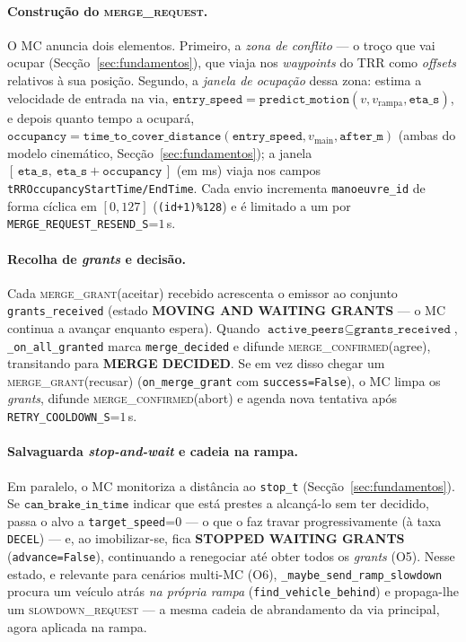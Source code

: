 \documentclass[11pt,a4paper]{article}
\begin{document}
\paragraph{Construção do \textsc{merge\_request}.} O MC anuncia dois elementos. Primeiro, a
\emph{zona de conflito} --- o troço que vai ocupar
(Secção~\ref{sec:fundamentos}), que viaja nos \emph{waypoints} do TRR como \emph{offsets}
relativos à sua posição. Segundo, a \emph{janela de ocupação} dessa zona: estima a
velocidade de entrada na via,
$\texttt{entry\_speed}=\texttt{predict\_motion}(v, v_{\text{rampa}}, \texttt{eta\_s})$, e
depois quanto tempo a ocupará,
$\texttt{occupancy}=\texttt{time\_to\_cover\_distance}(\texttt{entry\_speed}, v_{\text{main}}, \texttt{after\_m})$
(ambas do modelo cinemático, Secção~\ref{sec:fundamentos}); a janela
$[\,\texttt{eta\_s},\ \texttt{eta\_s}+\texttt{occupancy}\,]$ (em ms) viaja nos campos
\texttt{tRROccupancyStartTime/EndTime}. Cada envio incrementa \texttt{manoeuvre\_id} de
forma cíclica em $[0,127]$ (\texttt{(id+1)\%128}) e é limitado a um por
\texttt{MERGE\_REQUEST\_RESEND\_S}=$1$\,s.

\paragraph{Recolha de \emph{grants} e decisão.} Cada \textsc{merge\_grant}(aceitar) recebido
acrescenta o emissor ao conjunto \texttt{grants\_received} (estado
\textbf{MOVING AND WAITING GRANTS} --- o MC continua a avançar enquanto espera). Quando
$\texttt{active\_peers} \subseteq \texttt{grants\_received}$, \texttt{\_on\_all\_granted}
marca \texttt{merge\_decided} e difunde \textsc{merge\_confirmed}(agree), transitando para
\textbf{MERGE DECIDED}. Se em vez disso chegar um \textsc{merge\_grant}(recusar)
(\texttt{on\_merge\_grant} com \texttt{success=False}), o MC limpa os \emph{grants},
difunde \textsc{merge\_confirmed}(abort) e agenda nova tentativa após
\texttt{RETRY\_COOLDOWN\_S}=$1$\,s.

\paragraph{Salvaguarda \emph{stop-and-wait} e cadeia na rampa.} Em paralelo, o MC monitoriza
a distância ao \texttt{stop\_t} (Secção~\ref{sec:fundamentos}). Se
$\texttt{can\_brake\_in\_time}$ indicar que está prestes a alcançá-lo sem ter decidido,
passa o alvo a \texttt{target\_speed}=0 --- o que o faz travar progressivamente (à taxa
\texttt{DECEL}) --- e, ao imobilizar-se, fica \textbf{STOPPED WAITING GRANTS}
(\texttt{advance=False}), continuando a renegociar até obter todos os \emph{grants} (O5).
Nesse estado, e relevante para cenários multi-MC (O6),
\texttt{\_maybe\_send\_ramp\_slowdown} procura um veículo atrás \emph{na própria rampa}
(\texttt{find\_vehicle\_behind}) e propaga-lhe um \textsc{slowdown\_request} --- a mesma
cadeia de abrandamento da via principal, agora aplicada na rampa.
\end{document}
